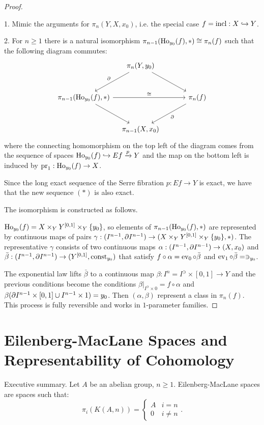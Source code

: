 \begin{proof}\ 

1. Mimic the arguments for $\pi_n(Y,X,x_0)$, i.e. the special case $f=\operatorname{incl}:X\hookrightarrow Y$.

2. For $n\geq1$ there is a natural isomorphism $\pi_{n-1}(\operatorname{Ho}_{y_0}(f),*)\cong\pi_n(f)$ such that the following diagram commutes:
\[
\begin{tikzcd}[column sep={8em,between origins},row sep=large]
& \pi_n(Y,y_0) \arrow[dl,"\de"'] \arrow[dr] & \\
\pi_\ni(\ho_{y_0}(f),*) \arrow[dr] \arrow[rr,"\cong"] && \pi_n(f) \arrow[dl,"\de"] \\
 & \pi_\ni(X,x_0) &
\end{tikzcd}
\]
where the connecting homomorphism on the top left of the diagram comes from the sequence of spaces $\operatorname{Ho}_{y_0}(f)\hookrightarrow Ef\xrightarrow{p} Y$ and the map on the bottom left is induced by $\operatorname{pr}_1:\operatorname{Ho}_{y_0}(f)\to X$.

Since the long exact sequence of the Serre fibration $p:Ef\to Y$ is exact, we have that the new sequence $(*)$ is also exact.

The isomorphism is constructed as follows.

$\operatorname{Ho}_{y_0}(f)=X\times_Y Y^{[0,1]}\times_Y\{y_0\}$, so elements of $\pi_{n-1}(\operatorname{Ho}_{y_0}(f),*)$ are represented by continuous maps of pairs $\gamma:(I^{n-1},\partial I^{n-1})\to (X\times_Y Y^{[0,1]}\times_Y\{y_0\},*)$. The representative $\gamma$ consists of two continuous maps $\alpha:(I^{n-1},\partial I^{n-1})\to(X,x_0)$ and $\bar\beta:(I^{n-1},\partial I^{n-1})\to(Y^{[0,1]},\operatorname{const}_{y_0})$ that satisfy $f\circ\alpha=\operatorname{ev}_0\circ\bar\beta$ and $\ev_1\circ\bar\beta=\cont_{y_0}$.

The exponential law lifts $\bar\beta$ to a continuous map $\beta:I^n=I^\ni\times[0,1]\to Y$ and the previous conditions become the conditions $\beta|_{I^\ni\times0}=f\circ\alpha$ and $\beta(\partial I^{n-1}\times[0,1]\cup I^{n-1}\times1)=y_0$. Then $(\alpha,\beta)$ represent a class in $\pi_n(f)$. This process is fully reversible and works in $1$-parameter families.
\end{proof}

\chapter{Eilenberg-MacLane Spaces and Representability of Cohomology}

Executive summary. Let $A$ be an abelian group, $n\geq1$.
Eilenberg-MacLane spaces are spaces such that:
\[\pi_i(K(A,n))=\begin{cases}
A & i=n\\
0 & i\neq n
\end{cases}.\]

